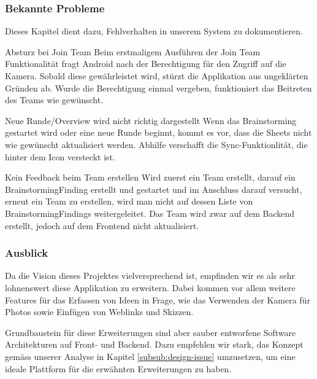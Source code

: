 \subsubsection{Bekannte Probleme}
Dieses Kapitel dient dazu, Fehlverhalten in unserem System zu dokumentieren.

\begin{basedescript}{
		\desclabelstyle{\multilinelabel}
		\desclabelwidth{4.5cm}
		\setlength{\itemsep}{5ex}}
	\item [Absturz bei Join Team] Beim erstmaligem Ausführen der Join Team Funktionalität fragt Android nach der Berechtigung für den Zugriff auf die Kamera. Sobald diese gewährleistet wird, stürzt die Applikation aus ungeklärten Gründen ab. Wurde die Berechtigung einmal vergeben, funktioniert das Beitreten des Teams wie gewünscht.
	
	\item [Neue Runde/Overview wird nicht richtig dargestellt] 
	Wenn das Brainstorming gestartet wird oder eine neue Runde beginnt, kommt es vor, dass die Sheets nicht wie gewünscht aktualisiert werden. Abhilfe verschafft die Sync-Funktionlität, die hinter dem Icon versteckt ist.
	
	\item [Kein Feedback beim Team erstellen] 
	Wird zuerst ein Team erstellt, darauf ein BrainstormingFinding erstellt und gestartet und im Anschluss darauf versucht, erneut ein Team zu erstellen, wird man nicht auf dessen Liste von BrainstormingFindings weitergeleitet. Das Team wird zwar auf dem Backend erstellt, jedoch auf dem Frontend nicht aktualisiert.
\end{basedescript}


\subsubsection{Ausblick}
\label{subsub:Ausblick}

Da die Vision dieses Projektes vielversprechend ist, empfinden wir es als sehr lohnenswert diese Applikation zu erweitern. Dabei kommen vor allem weitere Features für das Erfassen von Ideen in Frage, wie das Verwenden der Kamera für Photos sowie  Einfügen von Weblinks und Skizzen.

Grundbaustein für diese Erweiterungen sind aber sauber entworfene Software Architekturen auf Front- und Backend. Dazu empfehlen wir stark, das Konzept gemäss unserer Analyse in Kapitel \ref{subsub:design-issue} umzusetzen, um eine ideale Plattform für die erwähnten Erweiterungen zu haben. 

